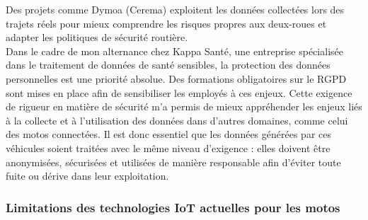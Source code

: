 Des projets comme Dymoa (Cerema) exploitent les données collectées lors des trajets réels pour mieux comprendre les risques propres aux deux-roues et adapter les politiques de sécurité routière.
\\
Dans le cadre de mon alternance chez Kappa Santé, une entreprise spécialisée dans le traitement de données de santé sensibles, la protection des données personnelles est une priorité absolue. Des formations obligatoires sur le RGPD sont mises en place afin de sensibiliser les employés à ces enjeux. Cette exigence de rigueur en matière de sécurité m’a permis de mieux appréhender les enjeux liés à la collecte et à l’utilisation des données dans d’autres domaines, comme celui des motos connectées. Il est donc essentiel que les données générées par ces véhicules soient traitées avec le même niveau d’exigence : elles doivent être anonymisées, sécurisées et utilisées de manière responsable afin d’éviter toute fuite ou dérive dans leur exploitation.



\subsubsection{Limitations des technologies IoT actuelles pour les motos}

